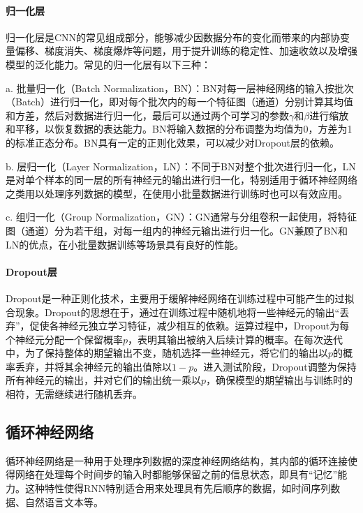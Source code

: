 \paragraph{归一化层}

归一化层是CNN的常见组成部分，能够减少因数据分布的变化而带来的内部协变量偏移、梯度消失、梯度爆炸等问题，用于提升训练的稳定性、加速收敛以及增强模型的泛化能力。常见的归一化层有以下三种：

a. 批量归一化（Batch Normalization，BN）：BN对每一层神经网络的输入按批次（Batch）进行归一化，即对每个批次内的每一个特征图（通道）分别计算其均值和方差，然后对数据进行归一化，最后可以通过两个可学习的参数\(\gamma\)和\(\beta\)进行缩放和平移，以恢复数据的表达能力。BN将输入数据的分布调整为均值为0，方差为1的标准正态分布。BN具有一定的正则化效果，可以减少对Dropout层的依赖。

b. 层归一化（Layer Normalization，LN）：不同于BN对整个批次进行归一化，LN是对单个样本的同一层的所有神经元的输出进行归一化，特别适用于循环神经网络之类用以处理序列数据的模型，在使用小批量数据进行训练时也可以有效应用。

c. 组归一化（Group Normalization，GN）：GN通常与分组卷积\cite{krizhevsky2017imagenet}一起使用，将特征图（通道）分为若干组，对每一组内的神经元输出进行归一化。GN兼顾了BN和LN的优点，在小批量数据训练等场景具有良好的性能。

\paragraph{Dropout层}

Dropout是一种正则化技术，主要用于缓解神经网络在训练过程中可能产生的过拟合现象。Dropout的思想在于，通过在训练过程中随机地将一些神经元的输出“丢弃”，促使各神经元独立学习特征，减少相互的依赖。运算过程中，Dropout为每个神经元分配一个保留概率\(p\)，表明其输出被纳入后续计算的概率。在每次迭代中，为了保持整体的期望输出不变，随机选择一些神经元，将它们的输出以\(p\)的概率丢弃，并将其余神经元的输出值除以\(1-p\)。进入测试阶段，Dropout调整为保持所有神经元的输出，并对它们的输出统一乘以\(p\)，确保模型的期望输出与训练时的相符，无需继续进行随机丢弃。

\subsection{循环神经网络}

循环神经网络是一种用于处理序列数据的深度神经网络结构，其内部的循环连接使得网络在处理每个时间步的输入时都能够保留之前的信息状态，即具有“记忆”能力。这种特性使得RNN特别适合用来处理具有先后顺序的数据，如时间序列数据、自然语言文本等。

